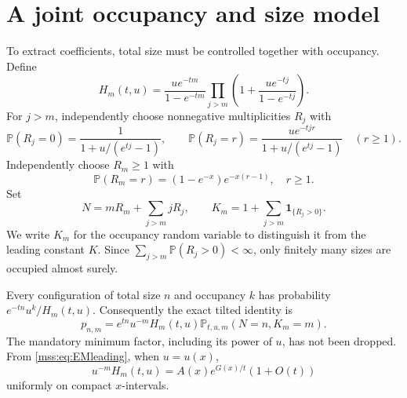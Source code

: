 \documentclass[11pt,letterpaper]{article}
\numberwithin{equation}{section}
\theoremstyle{definition}\newtheorem{definition}[theorem]{Definition}
\theoremstyle{remark}\newtheorem{remark}[theorem]{Remark}
\newcommand{\Prob}{\mathbb P}
\begin{document}
\section{A joint occupancy and size model}\label{mss:sec:joint}
To extract coefficients, total size must be controlled together with occupancy. Define
\begin{equation}\label{mss:eq:H}
H_m(t,u)=\frac{u e^{-tm}}{1-e^{-tm}}
\prod_{j>m}\left(1+\frac{u e^{-tj}}{1-e^{-tj}}\right).
\end{equation}
For $j>m$, independently choose nonnegative multiplicities $R_j$ with
\begin{equation}\label{mss:eq:Rlaw}
\Prob(R_j=0)=\frac1{1+u/(e^{tj}-1)},\qquad
\Prob(R_j=r)=\frac{u e^{-tjr}}{1+u/(e^{tj}-1)}\quad(r\ge1).
\end{equation}
Independently choose $R_m\ge1$ with
\begin{equation}\label{mss:eq:mandatory}
\Prob(R_m=r)=(1-e^{-x})e^{-x(r-1)},\quad r\ge1.
\end{equation}
Set
\begin{equation}\label{mss:eq:NK}
N=mR_m+\sum_{j>m}jR_j,\qquad
K_m=1+\sum_{j>m}\mathbf1_{\{R_j>0\}}.
\end{equation}
We write $K_m$ for the occupancy random variable to distinguish it from the leading constant $K$. Since $\sum_{j>m}\Prob(R_j>0)<\infty$, only finitely many sizes are occupied almost surely.

Every configuration of total size $n$ and occupancy $k$ has probability $e^{-tn}u^k/H_m(t,u)$. Consequently the exact tilted identity is
\begin{equation}\label{mss:eq:tilt}
p_{n,m}=e^{tn}u^{-m}H_m(t,u)\Prob_{t,u,m}(N=n,K_m=m).
\end{equation}
The mandatory minimum factor, including its power of $u$, has not been dropped. From \eqref{mss:eq:EMleading}, when $u=u(x)$,
\begin{equation}\label{mss:eq:Hradial}
u^{-m}H_m(t,u)=A(x)e^{G(x)/t}(1+O(t))
\end{equation}
uniformly on compact $x$-intervals.
\end{document}
